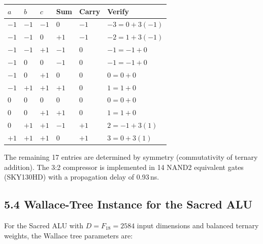 \begin{longtable}[]{@{}
  >{\raggedright\arraybackslash}p{}
  >{\raggedright\arraybackslash}p{}
  >{\raggedright\arraybackslash}p{}
  >{\raggedright\arraybackslash}p{}
  >{\raggedright\arraybackslash}p{}
  >{\raggedright\arraybackslash}p{}@{}}
\toprule\noalign{}
\(a\) & \(b\) & \(c\) & Sum & Carry & Verify \\
\midrule\noalign{}
\endhead
\bottomrule\noalign{}
\endlastfoot
\(-1\) & \(-1\) & \(-1\) & \(0\) & \(-1\) & \(-3 = 0 + 3(-1)\) \\
\(-1\) & \(-1\) & \(0\) & \(+1\) & \(-1\) & \(-2 = 1 + 3(-1)\) \\
\(-1\) & \(-1\) & \(+1\) & \(-1\) & \(0\) & \(-1 = -1 + 0\) \\
\(-1\) & \(0\) & \(0\) & \(-1\) & \(0\) & \(-1 = -1 + 0\) \\
\(-1\) & \(0\) & \(+1\) & \(0\) & \(0\) & \(0 = 0 + 0\) \\
\(-1\) & \(+1\) & \(+1\) & \(+1\) & \(0\) & \(1 = 1 + 0\) \\
\(0\) & \(0\) & \(0\) & \(0\) & \(0\) & \(0 = 0 + 0\) \\
\(0\) & \(0\) & \(+1\) & \(+1\) & \(0\) & \(1 = 1 + 0\) \\
\(0\) & \(+1\) & \(+1\) & \(-1\) & \(+1\) & \(2 = -1 + 3(1)\) \\
\(+1\) & \(+1\) & \(+1\) & \(0\) & \(+1\) & \(3 = 0 + 3(1)\) \\
\end{longtable}

The remaining 17 entries are determined by symmetry (commutativity of
ternary addition). The 3:2 compressor is implemented in 14 NAND2
equivalent gates (SKY130HD) with a propagation delay of 0.93\,ns.

\subsection{5.4 Wallace-Tree Instance for the Sacred ALU}

For the Sacred ALU with \(D = F_{18} = 2584\) input dimensions and
balanced ternary weights, the Wallace tree parameters are:


